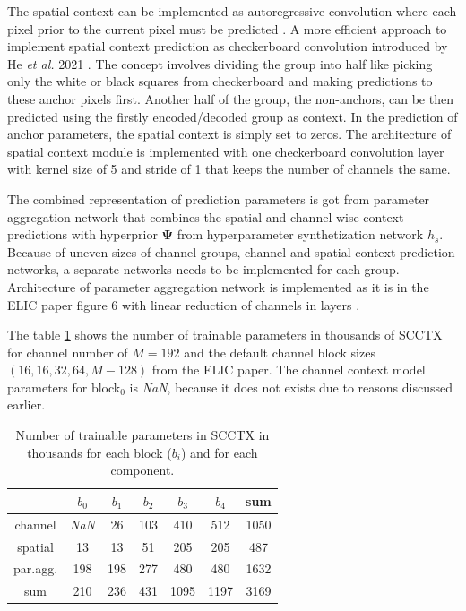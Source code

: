 \documentclass{article}
\begin{document}
The spatial context can be implemented as autoregressive convolution where each pixel prior to the current pixel must be predicted \cite{mbt2018}. A more efficient approach to implement spatial context prediction as checkerboard convolution introduced by He \textit{et al.} 2021 \cite{checkerboard}. The concept involves dividing the group into half like picking only the white or black squares from checkerboard and making predictions to these anchor pixels first. Another half of the group, the non-anchors, can be then predicted using the firstly encoded/decoded group as context. In the prediction of anchor parameters, the spatial context is simply set to zeros. The architecture of spatial context module is implemented with one checkerboard convolution layer with kernel size of 5 and stride of 1 that keeps the number of channels the same. 

The combined representation of prediction parameters is got from parameter aggregation network that combines the spatial and channel wise context predictions with hyperprior $\mathbf{\Psi}$ from hyperparameter synthetization network $h_s$. Because of uneven sizes of channel groups, channel and spatial context prediction networks, a separate networks needs to be implemented for each group. Architecture of parameter aggregation network is implemented as it is in the ELIC paper figure 6 with linear reduction of channels in layers \cite{ELIC}. 

The table \ref{table:SCCTX} shows the number of trainable parameters in thousands of SCCTX for channel number of $M=192$ and the default channel block sizes $(16,16,32,64,M-128)$ from the ELIC paper. The channel context model parameters for block$_0$ is \textit{NaN}, because it does not exists due to reasons discussed earlier. 

\begin{table}[!h]
\label{table:SCCTX}
\begin{center}
\caption{Number of trainable parameters in SCCTX in\\ thousands for each block ($b_i$) and for each component.}
\begin{tabular}{c c c c c c c} 
 \hline
  & $b_0$ & $b_1$ & $b_2$ & $b_3$ & $b_4$ & sum \\
 \hline\hline
 channel & \textit{NaN} & 26 & 103 & 410 & 512 & 1050 \\
 \hline
 spatial & 13 & 13 & 51 & 205 & 205 & 487 \\
 \hline
 par.agg. & 198 & 198 & 277 & 480 & 480 & 1632 \\
 \hline
 sum & 210 & 236 & 431 & 1095 & 1197 & 3169 \\
 \hline
\end{tabular}
\end{center}
\end{table}
\end{document}
